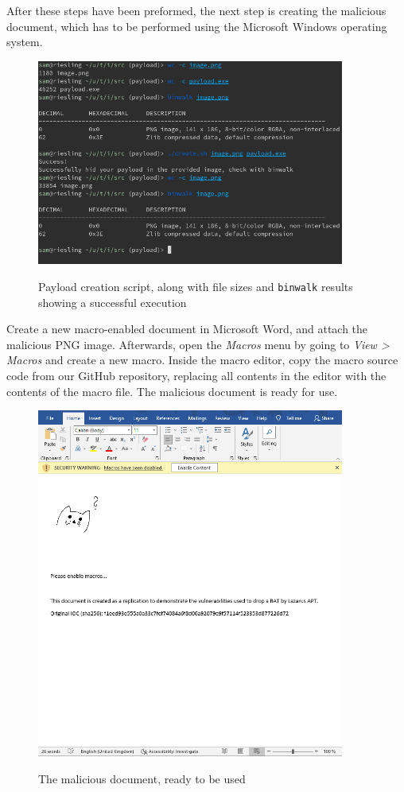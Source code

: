 After these steps have been preformed, the next step is creating the malicious document, which has to be performed using
the Microsoft Windows operating system. 
\begin{figure}[H]
  \centering
  \includegraphics[width=0.9\textwidth]{figures/payload_creation_script.png}
  \label{payload_creation_script}
  \caption{Payload creation script, along with file sizes and \texttt{binwalk} results showing a successful execution}
\end{figure}

Create a new macro-enabled document in Microsoft Word, and attach the malicious \acrshort{PNG} image.
Afterwards, open the \emph{Macros} menu by going to \emph{View > Macros} and create a new macro. Inside the macro
editor, copy the macro source code from our GitHub repository, replacing all contents in the editor with the contents of
the macro file. The malicious document is ready for use.

\begin{figure}[H]
  \centering
  \includegraphics[width=0.9\textwidth]{figures/malicious_document.png}
  \label{malicious_document}
  \caption{The malicious document, ready to be used}
\end{figure}


